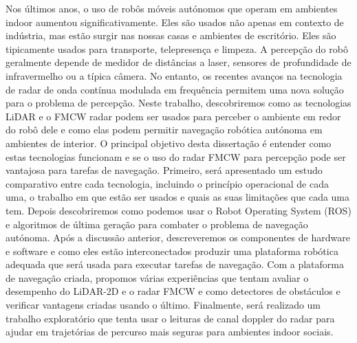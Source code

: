 \TitlePage
  \vspace*{55mm}
       {Nos últimos anos, o uso de robôs móveis autónomos que operam em ambientes indoor aumentou significativamente. Eles são usados não apenas
        em contexto de indústria, mas estão surgir nas nossas casas e ambientes de escritório. Eles são tipicamente usados para transporte, telepresença e limpeza. A percepção do robô geralmente depende de medidor de distâncias a laser, sensores de profundidade de infravermelho ou a típica câmera. No entanto, os recentes avanços na tecnologia de radar de onda contínua modulada em frequência permitem uma nova solução para o problema de percepção. Neste trabalho, descobriremos como  as tecnologias \ac{LiDAR} e o \ac{FMCW} \ac{radar} podem ser usados para perceber o ambiente em redor do robô dele e como elas podem permitir  navegação robótica autónoma em ambientes de interior. O principal objetivo desta dissertação é
        entender como estas tecnologias funcionam e se o uso do radar FMCW para
        percepção pode ser vantajosa para tarefas de navegação.
       }
       \TEXT{}
       { Primeiro, será apresentado um estudo comparativo entre cada tecnologia, incluindo o princípio operacional de cada uma, o trabalho em que estão ser usados e quais as suas limitações que cada uma tem. Depois descobriremos como podemos usar o Robot Operating
        System (ROS) e algoritmos de última geração para combater o problema de navegação autónoma. Após a discussão anterior, descreveremos
        os componentes de hardware e software e como eles estão interconectados
        produzir uma plataforma robótica adequada que será usada para executar tarefas de navegação.
        Com a plataforma de navegação criada, propomos várias experiências que
        tentam avaliar o desempenho do LiDAR-2D e o radar FMCW e  como
        detectores de obstáculos e verificar vantagens criadas usando o
        último. Finalmente, será realizado um trabalho exploratório que tenta usar o
        leituras de canal doppler do radar para ajudar em trajetórias de percurso mais seguras para ambientes indoor sociais.}
       \TEXT{}     
       {%
       }
 
